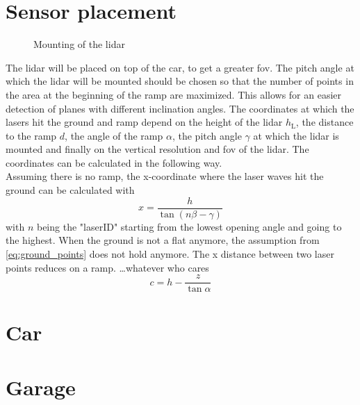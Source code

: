 \section{Sensor placement}
\begin{figure}[htpb]
	\centering
	
	\caption{Mounting of the \gls{lidar}}
	\label{fig:tikz_lidar_mount}
\end{figure}
The \gls{lidar} will be placed on top of the car, to get a greater \gls{fov}.
The pitch angle at which the \gls{lidar} will be mounted should be chosen so that the number of points in the area at the beginning of the ramp are maximized.
This allows for an easier detection of planes with different inclination angles.
The coordinates at which the lasers hit the ground and ramp depend on the height of the \gls{lidar} $ h_\mathrm{L} $, the distance to the ramp $d$, the angle of the ramp $\alpha$, the pitch angle $\gamma$ at which the \gls{lidar} is mounted and finally on the vertical resolution and \gls{fov} of the \gls{lidar}. The coordinates can be calculated in the following way.\\
Assuming there is no ramp, the x-coordinate where the laser waves hit the ground can be calculated with
\begin{equation}
	x = \frac{h}{\tan(n\beta - \gamma)}
	\label{eq:ground_points}
\end{equation}
with $n$ being the "laserID" starting from the lowest opening angle and going to the highest.
When the ground is not a flat anymore, the assumption from \ref{eq:ground_points} does not hold anymore. The x distance between two laser points reduces on a ramp.
\dots whatever who cares
\[ c = h - \frac{z}{\tan \alpha} \]



\section{Car}



\section{Garage}
